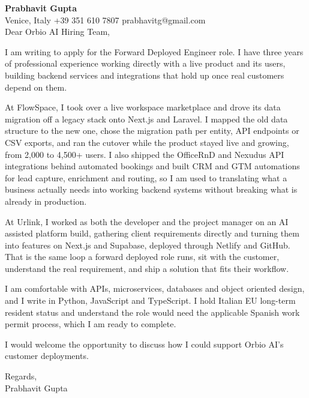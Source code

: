\documentclass[a4paper,10.5pt]{article}
\begin{document}
\textbf{Prabhavit Gupta}\\
Venice, Italy \textbar{} +39 351 610 7807 \textbar{} prabhavitg@gmail.com\\[10pt]
Dear Orbio AI Hiring Team,

I am writing to apply for the Forward Deployed Engineer role. I have three years of professional experience working directly with a live product and its users, building backend services and integrations that hold up once real customers depend on them.

At FlowSpace, I took over a live workspace marketplace and drove its data migration off a legacy stack onto Next.js and Laravel. I mapped the old data structure to the new one, chose the migration path per entity, API endpoints or CSV exports, and ran the cutover while the product stayed live and growing, from 2,000 to 4,500+ users. I also shipped the OfficeRnD and Nexudus API integrations behind automated bookings and built CRM and GTM automations for lead capture, enrichment and routing, so I am used to translating what a business actually needs into working backend systems without breaking what is already in production.

At Urlink, I worked as both the developer and the project manager on an AI assisted platform build, gathering client requirements directly and turning them into features on Next.js and Supabase, deployed through Netlify and GitHub. That is the same loop a forward deployed role runs, sit with the customer, understand the real requirement, and ship a solution that fits their workflow.

I am comfortable with APIs, microservices, databases and object oriented design, and I write in Python, JavaScript and TypeScript. I hold Italian EU long-term resident status and understand the role would need the applicable Spanish work permit process, which I am ready to complete.

I would welcome the opportunity to discuss how I could support Orbio AI's customer deployments.

Regards,\\
Prabhavit Gupta
\end{document}
